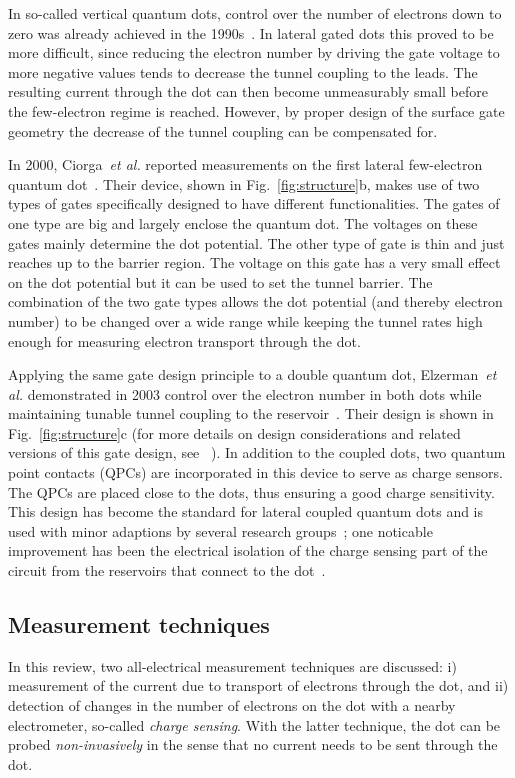 \documentclass[rmp,twocolumn,aps]{revtex4}
\begin{document}
In so-called vertical quantum dots, control over the number of electrons
down to zero was already achieved in the 1990s~\cite{kouwenhoven01}. In
lateral gated dots this proved to be more difficult, since
reducing the electron number by driving the gate voltage to more
negative values tends to decrease the tunnel coupling to the
leads. The resulting current through the dot can then become
unmeasurably small before the few-electron regime is reached.
However, by proper design of the surface gate geometry the
decrease of the tunnel coupling can be compensated for.

In 2000, Ciorga~\textit{et al.} reported measurements on the first
lateral few-electron quantum dot~\cite{CiorgaPRB2000}. Their
device, shown in Fig.~\ref{fig:structure}b, makes use of two types
of gates specifically designed to have different functionalities.
The gates of one type are big and largely enclose the quantum dot.
The voltages on these gates mainly determine the dot potential.
The other type of gate is thin and just reaches up to the barrier
region. The voltage on this gate has a very small effect on the
dot potential but it can be used to set the tunnel barrier. The
combination of the two gate types allows the dot potential (and
thereby electron number) to be changed over a wide range while
keeping the tunnel rates high enough for measuring electron
transport through the dot.

Applying the same gate design principle to a double quantum dot,
Elzerman~\textit{et al.} demonstrated in 2003 control over the
electron number in both dots while maintaining tunable tunnel
coupling to the reservoir~\cite{ElzermanPRB2003}. Their design is
shown in Fig.~\ref{fig:structure}c (for more details on design
considerations and related versions of this gate design, see
~\textcite{HansonThesis2005}). In addition to the coupled
dots, two quantum point contacts (QPCs) are incorporated in this
device to serve as charge sensors. The QPCs are placed close to
the dots, thus ensuring a good charge sensitivity. This design has
become the standard for lateral coupled quantum dots and is used
with minor adaptions by several research
groups~\cite{PettaPRL2004,PioroPRB2005}; one noticable improvement
has been the electrical isolation of the charge sensing part of
the circuit from the reservoirs that connect to the
dot~\cite{HansonPRL2005}.

\subsection{Measurement techniques}
In this review, two all-electrical measurement techniques are
discussed: i) measurement of the current due to transport of
electrons through the dot, and ii) detection of changes in the
number of electrons on the dot with a nearby electrometer,
so-called \textit{charge sensing}. With the latter technique, the
dot can be probed \textit{non-invasively} in the sense that no
current needs to be sent through the dot.
\end{document}
